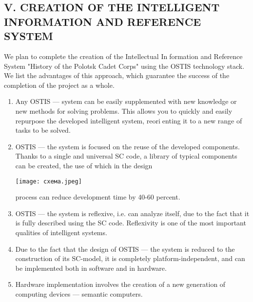 \documentclass{article}
\begin{document}
\begin{multicols}{2}
\begin{center}
\chapter{V. CREATION OF THE INTELLIGENT INFORMATION
AND REFERENCE SYSTEM}
\end{center}
\vspace{7pt}
\par We plan to complete the creation of the Intellectual Information and Reference System "History of the Polotsk
Cadet Corps" using the OSTIS technology stack. We list
the advantages of this approach, which guarantee the
success of the completion of the project as a whole.
\begin{enumerate}[noitemsep]
    \item  Any OSTIS — system can be easily supplemented
with new knowledge or new methods for solving
problems. This allows you to quickly and easily
repurpose the developed intelligent system, reorienting it to a new range of tasks to be solved.
    \item OSTIS — the system is focused on the reuse of
the developed components. Thanks to a single and
universal SC code, a library of typical components
can be created, the use of which in the design
\columnbreak
\setcounter{figure}{1}
\afterpage{\clearpage}
\begin{center}
  \texttt{[image: схема.jpeg]}
  \label{fig:структура}
\end{center}
process can reduce development time by 40-60 percent.
\item OSTIS — the system is reflexive, i.e. can analyze
itself, due to the fact that it is fully described
using the SC code. Reflexivity is one of the most
important qualities of intelligent systems.
    \item Due to the fact that the design of OSTIS —
the system is reduced to the construction of its
SC-model, it is completely platform-independent,
and can be implemented both in software and in
hardware.
    \item Hardware implementation involves the creation of
a new generation of computing devices — semantic
computers.
\end{enumerate}
\begin{center}

\end{center}
\end{multicols}
\end{document}
